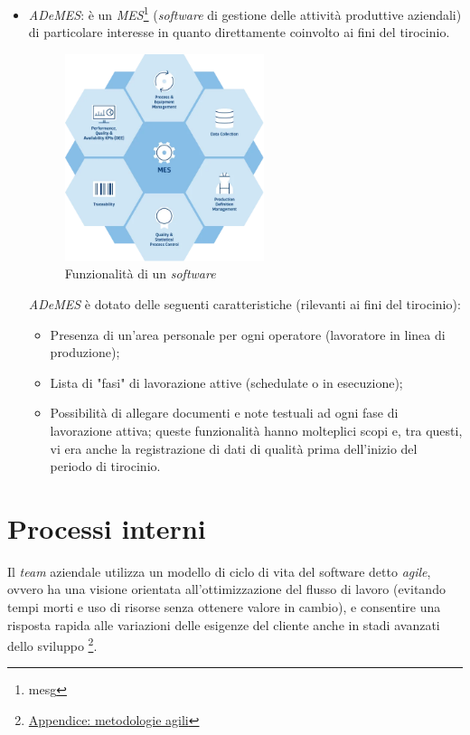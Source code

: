 \begin{itemize}
    \item \textit{ADeMES}: è un \textit{MES}\footnote{\gls{mesg}} (\textit{software} di gestione delle attività produttive aziendali) di particolare interesse in quanto direttamente coinvolto ai fini del tirocinio.
    \begin{figure}[H]
        \centering
        \includegraphics[width=0.55\textwidth]{images/mes.png}
        \caption[Caption for LOF]{Funzionalità di un \textit{software } \footnotemark}
    \end{figure}
    {}

    \textit{ADeMES} è dotato delle seguenti caratteristiche (rilevanti ai fini del tirocinio):
    \begin{itemize}
        \item Presenza di un'area personale per ogni operatore (lavoratore in linea di produzione);
        \item Lista di "fasi" di lavorazione attive (schedulate o in esecuzione);
        \item Possibilità di allegare documenti e note testuali ad ogni fase di lavorazione attiva; queste funzionalità hanno molteplici scopi e, tra questi, vi era anche la registrazione di dati di qualità prima dell'inizio del periodo di tirocinio.
    \end{itemize}
\end{itemize}

\section{Processi interni}

Il \textit{team} aziendale utilizza un modello di ciclo di vita del software detto \textit{agile}, ovvero ha una visione orientata all'ottimizzazione del flusso di lavoro (evitando tempi morti e uso di risorse senza ottenere valore in cambio), 
e consentire una risposta rapida alle variazioni delle esigenze del cliente anche in stadi avanzati dello sviluppo \footnote{\hyperref[app:agile]{Appendice: metodologie agili}}.

